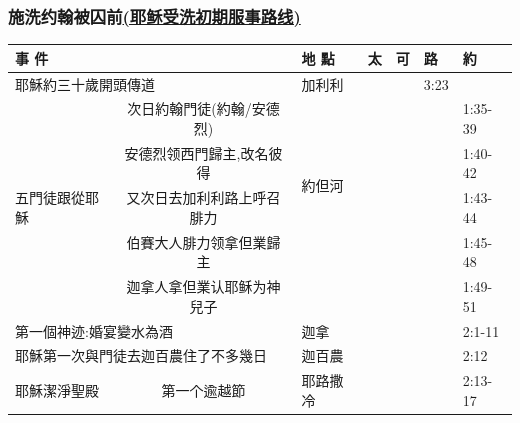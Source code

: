 \subsubsection{施洗约翰被囚前\href{http://biblegeography.holylight.org.tw/index/condensedbible_map_detail?m_id=108}{(耶稣受洗初期服事路线)}}
\begin{table}[H]
\centering
\begin{tabular}{p{6.45em}|c|p{4.785em}|r|p{}|p{3.23em}|p{3.5em}}\toprule

\multicolumn{2}{p{20.5em}|}{事 件} & 地 點& \multicolumn{1}{p{3.23em}|}{太} & \multicolumn{1}{p{3.23em}|}{可}    & \multicolumn{1}{p{3.23em}|}{路} & \multicolumn{1}{p{3.5em}}{約} \\\midrule\midrule

\multicolumn{2}{p{20.5em}|}{耶穌約三十歲開頭傳道} & \multicolumn{1}{p{5.355em}|}{加利利} &\multicolumn{1}{p{4.145em}|}{}&\multicolumn{1}{p{3.85em}|}{}&\multicolumn{1}{p{3.5em}|}{3:23}& \\ \midrule

\multirow{5}[8]{*}{五門徒跟從耶穌} & \multicolumn{1}{p{13.355em}|}{次日約翰門徒(約翰/安德烈)} & \multirow{4}[8]{*}{約但河} & & && 1:35-39 \\

\cmidrule{2-2}\cmidrule{4-7}    \multicolumn{1}{c|}{} & \multicolumn{1}{p{13.355em}|}{安德烈领西門歸主,改名彼得} & \multicolumn{1}{c|}{} & & & & 1:40-42 \\

\cmidrule{2-2}\cmidrule{4-7}    \multicolumn{1}{c|}{} & \multicolumn{1}{p{13.355em}|}{又次日去加利利路上呼召腓力} & \multicolumn{1}{c|}{} &  & & & 1:43-44 \\

\cmidrule{2-2}\cmidrule{4-7}\multicolumn{1}{c|}{} & \multicolumn{1}{p{13.355em}|}{伯賽大人腓力领拿但業歸主}&\multicolumn{1}{c|}{}&&&&1:45-48\\

\cmidrule{2-2}\cmidrule{4-7}\multicolumn{1}{c|}{} & \multicolumn{1}{p{13.355em}|}{迦拿人拿但業认耶稣为神兒子}&\multicolumn{1}{c|}{}&&&&1:49-51\\\midrule

\multicolumn{2}{p{20.5em}|}{第一個神迹:婚宴變水為酒}&迦拿&&&& 2:1-11\\\midrule

\multicolumn{2}{p{20.5em}|}{耶穌第一次與門徒去迦百農住了不多幾日}&迦百農&&&&2:12\\\midrule

耶穌潔淨聖殿 & 
\multicolumn{1}{c|}{\multirow{3}[6]{*}{第一个逾越節}} &
\multicolumn{1}{l|}{\multirow{3}[6]{*}{耶路撒冷}}&&&&2:13-17\\


\end{tabular}
\end{table}
